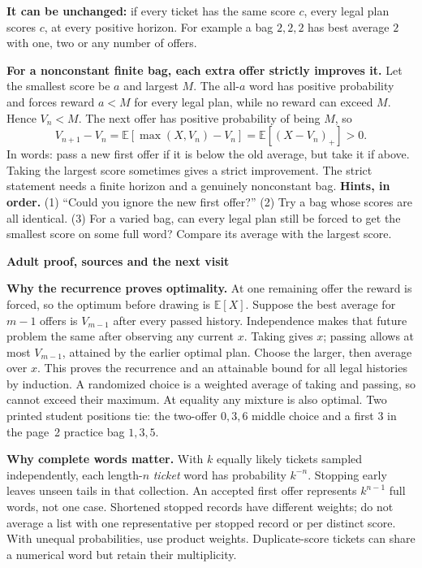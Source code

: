 \documentclass[11pt,letterpaper]{article}
\newcommand{\topic}[1]{\par\textbf{\large #1}\par}
\newcommand{\hint}[1]{\textbf{Hints, in order.} #1\par}
\begin{document}
\textbf{It can be unchanged:} if every ticket has the same score $c$, every legal
plan scores $c$, at every positive horizon. For example a bag $2,2,2$ has best
average $2$ with one, two or any number of offers.

\textbf{For a nonconstant finite bag, each extra offer strictly improves it.}
Let the smallest score be $a$ and largest $M$. The all-$a$ word has positive
probability and forces reward $a<M$ for every legal plan, while no reward can
exceed $M$. Hence $V_n<M$. The next offer has positive probability of being
$M$, so
\[
 V_{n+1}-V_n=\mathbb E[\max(X,V_n)-V_n]
             =\mathbb E[(X-V_n)_+]>0.
\]
In words: pass a new first offer if it is below the old average, but take it
if above. Taking the largest score sometimes gives a strict improvement.
The strict statement needs a finite horizon and a genuinely nonconstant bag.
\hint{(1) ``Could you ignore the new first offer?''
(2) Try a bag whose scores are all identical.
(3) For a varied bag, can every legal plan still be forced to get the smallest
score on some full word? Compare its average with the largest score.}

\newpage
\topic{Adult proof, sources and the next visit}
\textbf{Why the recurrence proves optimality.} At one remaining offer the reward
is forced, so the optimum before drawing is $\mathbb E[X]$. Suppose the best
average for $m-1$ offers is $V_{m-1}$ after every passed history. Independence
makes that future problem the same after observing any current $x$. Taking
gives $x$; passing allows at most $V_{m-1}$, attained by the earlier optimal
plan. Choose the larger, then average over $x$. This proves the recurrence
and an attainable bound for all legal histories by induction. A randomized
choice is a weighted average of taking and passing, so cannot exceed their
maximum. At equality any mixture is also optimal. Two printed student positions
tie: the two-offer $0,3,6$ middle choice and a first $3$ in the page~2
practice bag $1,3,5$.

\textbf{Why complete words matter.} With $k$ equally likely tickets sampled
independently, each length-$n$ \emph{ticket} word has probability $k^{-n}$.
Stopping early leaves unseen tails in that collection. An accepted first offer
represents $k^{n-1}$ full words, not one case. Shortened stopped records have
different weights; do not average a list with one representative per stopped
record or per distinct score. With unequal probabilities, use product weights.
Duplicate-score tickets can share a numerical word but retain their multiplicity.
\end{document}
